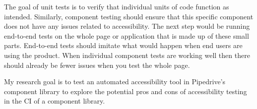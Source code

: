 \documentclass{master_thesis}
\begin{document}
The goal of unit tests is to verify that individual units of code function as intended. Similarly, component testing should ensure that this specific component does not have any issues related to accessibility. The next step would be running end-to-end tests on the whole page or application that is made up of these small parts. End-to-end tests should imitate what would happen when end users are using the product. When individual component tests are working well then there should already be fewer issues when you test the whole page.

My research goal is to test an automated accessibility tool in Pipedrive's component library to explore the potential pros and cons of accessibility testing in the CI of a component library.





\end{document}

